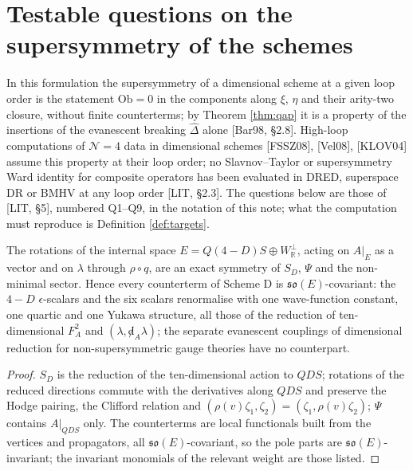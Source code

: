 
\section{Testable questions on the supersymmetry of the schemes}
\label{sec:questions}

In this formulation the supersymmetry of a dimensional scheme at a given loop order is the statement $\mathrm{Ob}=0$ in the components along $\xi$, $\eta$ and their arity-two closure, without finite counterterms; by Theorem \ref{thm:qap} it is a property of the insertions of the evanescent breaking $\widehat\Delta$ alone [Bar98, §2.8]. High-loop computations of $\mathcal N=4$ data in dimensional schemes [FSSZ08], [Vel08], [KLOV04] assume this property at their loop order; no Slavnov--Taylor or supersymmetry Ward identity for composite operators has been evaluated in DRED, superspace DR or BMHV at any loop order [LIT, §2.3]. The questions below are those of [LIT, §5], numbered Q1--Q9, in the notation of this note; what the computation must reproduce is Definition \ref{def:targets}.

\begin{proposition}
\label{prop:noevcoup}
The rotations of the internal space $E=Q(4{-}D)S\oplus W^\perp_{\mathbb R}$, acting on $A|_E$ as a vector and on $\lambda$ through $\rho\circ q$, are an exact symmetry of $S_D$, $\Psi$ and the non-minimal sector. Hence every counterterm of Scheme D is $\mathfrak{so}(E)$-covariant: the $4-D$ $\epsilon$-scalars and the six scalars renormalise with one wave-function constant, one quartic and one Yukawa structure, all those of the reduction of ten-dimensional $F_A^2$ and $(\lambda,{\not d}_A\lambda)$; the separate evanescent couplings of dimensional reduction for non-supersymmetric gauge theories have no counterpart.
\end{proposition}

\begin{proof}
$S_D$ is the reduction of the ten-dimensional action to $QDS$; rotations of the reduced directions commute with the derivatives along $QDS$ and preserve the Hodge pairing, the Clifford relation and $(\rho(v)\zeta_1,\zeta_2)=(\zeta_1,\rho(v)\zeta_2)$; $\Psi$ contains $A|_{QDS}$ only. The counterterms are local functionals built from the vertices and propagators, all $\mathfrak{so}(E)$-covariant, so the pole parts are $\mathfrak{so}(E)$-invariant; the invariant monomials of the relevant weight are those listed.
\end{proof}

